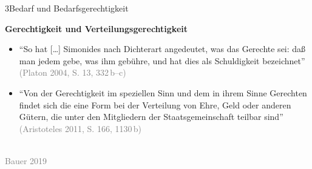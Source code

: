\documentclass[xcolor=table,9pt,aspectratio=169]{beamer}
\begin{document}
\begin{frame}{\vspace*{10mm}3\hspace*{1em}Bedarf und Bedarfsgerechtigkeit}
\begin{multicols}{2}
   \textbf{Gerechtigkeit und Verteilungsgerechtigkeit}\\
   \medskip
   \begin{itemize}
      \item \enquote{So hat [\ldots] Simonides nach Dichterart angedeutet, was das Gerechte sei: daß man jedem gebe, was ihm gebühre, und hat dies als Schuldigkeit bezeichnet} \textcolor{gray}{(Platon 2004, S. 13, 332\,b--c)}
      \item \enquote{Von der Gerechtigkeit im speziellen Sinn und dem in ihrem Sinne Gerechten findet sich die eine Form bei der Verteilung von Ehre, Geld oder anderen Gütern, die unter den Mitgliedern der Staatsgemeinschaft teilbar sind} \textcolor{gray}{(Aristoteles 2011, S. 166, 1130\,b)}
   \end{itemize}
   \vfill
   \begin{center}
      \\
      \footnotesize{\textcolor{gray}{Bauer 2019}}
   \end{center}
\end{multicols}
\end{frame}
\end{document}
